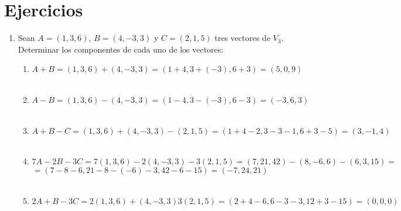 \section{Ejercicios}
\begin{enumerate}[\bfseries 1.]

\item Sean $A=(1,3,6)$, $B=(4,-3,3)$ y $C=(2,1,5)$ tres vectores de $V_3$. Determinar los componentes de cada uno de los vectores: 
\begin{enumerate}[\bfseries a)]

    \item $A+B = (1,3,6) + (4,-3,3) = (1+4,3+(-3),6+3) = (5,0,9)$\\\\

    \item $A-B = (1,3,6) - (4,-3,3) = (1-4,3-(-3),6-3) = (-3,6,3)$\\\\

    \item $A+B-C = (1,3,6)+(4,-3,3)-(2,1,5) = (1+4-2,3-3-1,6+3-5) = (3,-1,4)$\\\\

    \item $7A-2B-3C = 7(1,3,6)-2(4,-3,3)-3(2,1,5) = (7,21,42)-(8,-6,6)-(6,3,15) =$\\ $=(7-8-6,21-8-(-6)-3,42-6-15) = (-7,24,21)$\\\\

    \item $2A+B-3C = 2(1,3,6) + (4,-3,3) 3(2,1,5) = (2+4-6,6-3-3,12+3-15) = (0,0,0)$\\\\

\end{enumerate}


\end{enumerate}
